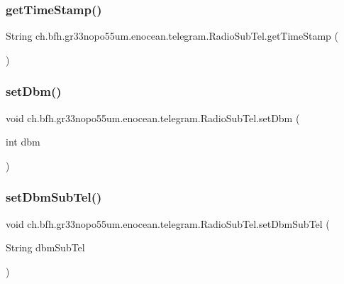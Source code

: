 \subsubsection{\texorpdfstring{get\+Time\+Stamp()}{getTimeStamp()}}
{\footnotesize\ttfamily String ch.\+bfh.\+gr33nopo55um.\+enocean.\+telegram.\+Radio\+Sub\+Tel.\+get\+Time\+Stamp (\begin{DoxyParamCaption}{ }\end{DoxyParamCaption})}

\hypertarget{classch_1_1bfh_1_1gr33nopo55um_1_1enocean_1_1telegram_1_1_radio_sub_tel_ad7233be54d8ce342ea85155c5aa44e32}{}\label{classch_1_1bfh_1_1gr33nopo55um_1_1enocean_1_1telegram_1_1_radio_sub_tel_ad7233be54d8ce342ea85155c5aa44e32} 
\subsubsection{\texorpdfstring{set\+Dbm()}{setDbm()}}
{\footnotesize\ttfamily void ch.\+bfh.\+gr33nopo55um.\+enocean.\+telegram.\+Radio\+Sub\+Tel.\+set\+Dbm (\begin{DoxyParamCaption}\item[{int}]{dbm }\end{DoxyParamCaption})}

\hypertarget{classch_1_1bfh_1_1gr33nopo55um_1_1enocean_1_1telegram_1_1_radio_sub_tel_a79de15f8b19b17b91252c2455a5ff28d}{}\label{classch_1_1bfh_1_1gr33nopo55um_1_1enocean_1_1telegram_1_1_radio_sub_tel_a79de15f8b19b17b91252c2455a5ff28d} 
\subsubsection{\texorpdfstring{set\+Dbm\+Sub\+Tel()}{setDbmSubTel()}}
{\footnotesize\ttfamily void ch.\+bfh.\+gr33nopo55um.\+enocean.\+telegram.\+Radio\+Sub\+Tel.\+set\+Dbm\+Sub\+Tel (\begin{DoxyParamCaption}\item[{String}]{dbm\+Sub\+Tel }\end{DoxyParamCaption})}

